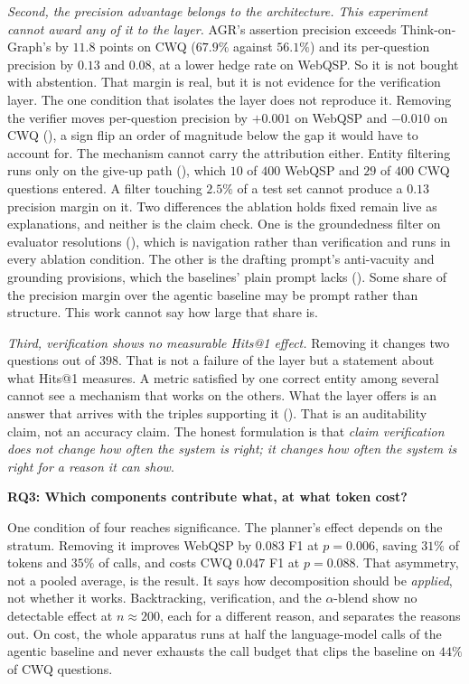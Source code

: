 \emph{Second, the precision advantage belongs to the architecture. This
experiment cannot award any of it to the layer.} AGR's assertion precision
exceeds Think-on-Graph's by $11.8$ points on CWQ ($67.9\%$ against $56.1\%$) and
its per-question precision by $0.13$ and $0.08$, at a lower hedge rate on
WebQSP. So it is not bought with abstention. That margin is real, but it is not
evidence for the verification layer. The one condition that isolates the layer
does not reproduce it. Removing the verifier moves per-question precision by
$+0.001$ on WebQSP and $-0.010$ on CWQ (), a sign flip an
order of magnitude below the gap it would have to account for. The mechanism
cannot carry the attribution either. Entity filtering runs only on the give-up
path (), which $10$ of $400$ WebQSP and $29$ of $400$
CWQ questions entered. A filter touching $2.5\%$ of a test set cannot produce a
$0.13$ precision margin on it. Two differences the ablation holds fixed remain
live as explanations, and neither is the claim check. One is the groundedness
filter on evaluator resolutions (), which is
navigation rather than verification and runs in every ablation condition. The
other is the drafting prompt's anti-vacuity and grounding provisions, which the
baselines' plain prompt lacks (). Some share of the
precision margin over the agentic baseline may be prompt rather than structure.
This work cannot say how large that share is.

\emph{Third, verification shows no measurable Hits@1 effect.} Removing it
changes two questions out of $398$. That is not a failure of the layer but a
statement about what Hits@1 measures. A metric satisfied by one correct entity
among several cannot see a mechanism that works on the others. What the layer
offers is an answer that arrives with the triples supporting it
(). That is an auditability claim, not an accuracy
claim. The honest formulation is that \emph{claim verification does not change
how often the system is right; it changes how often the system is right for a
reason it can show}.

\textbf{RQ3: Which components contribute what, at what token cost?}

One condition of four reaches significance. The planner's effect depends on the
stratum. Removing it improves WebQSP by $0.083$ F1 at $p = 0.006$, saving $31\%$
of tokens and $35\%$ of calls, and costs CWQ $0.047$ F1 at $p = 0.088$. That
asymmetry, not a pooled average, is the result. It says how decomposition should
be \emph{applied}, not whether it works. Backtracking, verification, and the
$\alpha$-blend show no detectable effect at $n \approx 200$, each for a
different reason, and  separates the reasons out. On cost,
the whole apparatus runs at half the language-model calls of the agentic
baseline and never exhausts the call budget that clips the baseline on $44\%$ of
CWQ questions.

